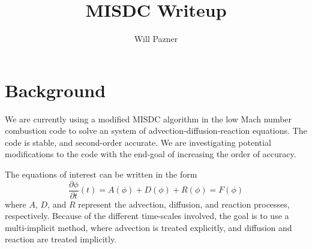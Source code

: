 \documentclass[12pt]{article}
\begin{document}
\title{MISDC Writeup}
\author{Will Pazner}
\maketitle

\section{Background}
We are currently using a modified MISDC algorithm in the low Mach number 
combustion code to solve an system of advection-diffusion-reaction 
equations. The code is stable, and second-order accurate. We are investigating 
potential modifications to the code with the end-goal of increasing the order 
of accuracy.

The equations of interest can be written in the form
\begin{equation}
    \frac{\partial \phi}{\partial t}(t) = A(\phi) + D(\phi) + R(\phi) = F(\phi)
\end{equation}
where $A$, $D$, and $R$ represent the advection, diffusion, and reaction 
processes, respectively. Because of the different time-scales involved, the 
goal is to use a multi-implicit method, where advection is treated explicitly, 
and diffusion and reaction are treated implicitly.
\end{document}
